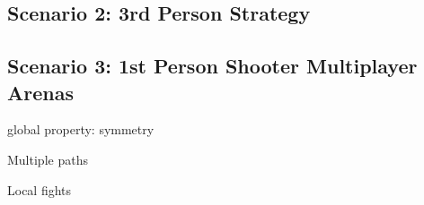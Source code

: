 \subsection{Scenario 2: 3rd Person Strategy}



\subsection{Scenario 3: 1st Person Shooter Multiplayer Arenas}

\begin{figure}[ht]
\centering
{}
\label{fig:fpsmaps}
\caption[Overview of classic FPS maps(from the game Counterstrike:Source). The "Multiple paths" pattern is clearly visible.]{}
\end{figure}




global property: symmetry

Multiple paths

Local fights

